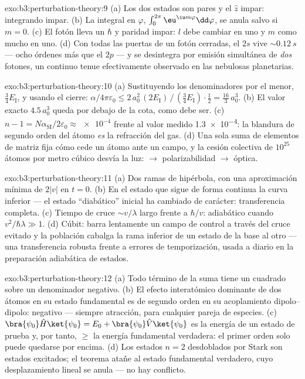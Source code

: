 \begin{solution}{exo:b3:perturbation-theory:9}
(a) Los dos estados son pares y el $\hat z$ impar: integrando impar. (b) La
integral en $\varphi$, $\int_0^{2\pi}\eu^{\iu m\varphi}\dd\varphi$,
se anula salvo si $m = 0$. (c) El fotón lleva un $\hbar$ y
paridad impar: $l$ debe cambiar en uno y $m$ como mucho en uno. (d) Con
todas las puertas de un fotón cerradas, el $2s$ vive $\sim\qty{0.12}{s}$ ---
ocho órdenes más que el $2p$ --- y se desintegra por emisión simultánea de
\emph{dos} fotones, un continuo tenue efectivamente observado en las
nebulosas planetarias.
\end{solution}

\begin{solution}{exo:b3:perturbation-theory:10}
(a) Sustituyendo los denominadores por el menor, $\tfrac34
E_{\text{I}}$, y usando el cierre: $\alpha/4\pi\varepsilon_0 \le
2\,a_0^2\,(2E_{\text{I}})\,/\,(\tfrac34 E_{\text{I}})\cdot\tfrac12
= \tfrac{16}3\,a_0^3$. (b) El valor exacto $4.5\,a_0^3$ queda por debajo de
la cota, como debe ser. (c) $n - 1 = N\alpha_{\text{SI}}/2\varepsilon_0
\approx \num{e-4}$ frente al valor medido \num{1.3e-4}: la blandura de
segundo orden del átomo \emph{es} la refracción del gas. (d) Una sola
suma de elementos de matriz fija cómo cede un átomo ante un campo, y la
cesión colectiva de $10^{25}$ átomos por metro cúbico desvía la
luz:  $\to$ polarizabilidad $\to$ óptica.
\end{solution}

\begin{solution}{exo:b3:perturbation-theory:11}
(a) Dos ramas de hipérbola, con una aproximación mínima de $2|v|$ en $t = 0$.
(b) En el estado que sigue de forma continua la curva inferior --- el
estado ``diabático'' inicial ha cambiado de carácter: transferencia
completa. (c) Tiempo de cruce $\sim v/\lambda$ largo frente a
$\hbar/v$: adiabático cuando $v^2/\hbar\lambda \gg 1$. (d) Cúbit:
barra lentamente un campo de control a través del cruce evitado y la
población cabalga la rama inferior de un estado de la base al
otro --- una transferencia robusta frente a errores de temporización, usada
a diario en la preparación adiabática de estados.
\end{solution}

\begin{solution}{exo:b3:perturbation-theory:12}
(a) Todo término de la suma tiene un cuadrado sobre un denominador negativo.
(b) El efecto interatómico dominante de dos átomos en su estado fundamental
es de segundo orden en su acoplamiento dipolo--dipolo: negativo --- siempre
atracción, para cualquier pareja de especies. (c) $\bra{\psi_0}\hat H\ket{
\psi_0} = E_0 + \bra{\psi_0}\hat V\ket{\psi_0}$ es la energía de un
estado de prueba y, por tanto, $\ge$ la energía fundamental verdadera: el
primer orden solo puede quedarse por encima. (d) Los estados $n = 2$
desdoblados por Stark son estados excitados; el teorema atañe al estado
fundamental verdadero, cuyo desplazamiento lineal se anula --- no hay
conflicto.
\end{solution}


